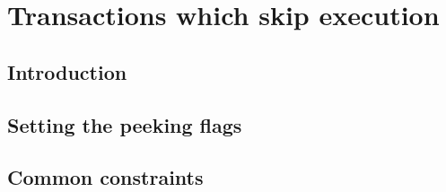 
\section{Transactions which skip \evm{} execution \lispDone{}}
\subsection{Introduction}                                        \label{hub: tx skip: intro}                     
\subsection{Setting the peeking flags             \lispDone{}}   \label{hub: tx skip: setting peeking flags}     
\subsection{Common constraints                    \lispDone{}}   \label{hub: tx skip: common}                    
